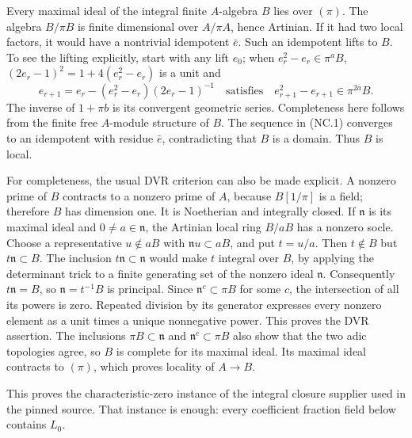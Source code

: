 Every maximal ideal of the integral finite \(A\)-algebra \(B\)
lies over \((\pi)\). The algebra \(B/\pi B\) is finite dimensional
over \(A/\pi A\), hence Artinian. If it had two local factors,
it would have a nontrivial idempotent \(\bar e\).
Such an idempotent lifts to \(B\). To see the lifting explicitly,
start with any lift \(e_0\); when \(e_r^2-e_r\in\pi^a B\),
\((2e_r-1)^2=1+4(e_r^2-e_r)\) is a unit and
\[
 e_{r+1}=e_r-(e_r^2-e_r)(2e_r-1)^{-1}
 \quad\text{satisfies}\quad
 e_{r+1}^2-e_{r+1}\in\pi^{2a}B.
 \tag{NC.1}
\]
The inverse of \(1+\pi b\) is its convergent geometric series.
Completeness here follows from the finite free \(A\)-module
structure of \(B\). The sequence in (NC.1) converges to an
idempotent with residue \(\bar e\), contradicting that \(B\)
is a domain. Thus \(B\) is local.

For completeness, the usual DVR criterion can also be made
explicit. A nonzero prime of \(B\) contracts to a nonzero prime
of \(A\), because \(B[1/\pi]\) is a field; therefore \(B\) has
dimension one. It is Noetherian and integrally closed.
If \(\mathfrak n\) is its maximal ideal and \(0\ne a\in\mathfrak n\),
the Artinian local ring \(B/aB\) has a nonzero socle. Choose a
representative \(u\notin aB\) with
\(\mathfrak n u\subset aB\), and put \(t=u/a\).
Then \(t\notin B\) but \(t\mathfrak n\subset B\).
The inclusion \(t\mathfrak n\subset\mathfrak n\) would make \(t\)
integral over \(B\), by applying the determinant trick to a finite
generating set of the nonzero ideal \(\mathfrak n\).
Consequently \(t\mathfrak n=B\), so \(\mathfrak n=t^{-1}B\)
is principal. Since \(\mathfrak n^c\subset\pi B\) for some \(c\),
the intersection of all its powers is zero. Repeated division
by its generator expresses every nonzero element as a unit times
a unique nonnegative power. This proves the DVR assertion.
The inclusions
\(\pi B\subset\mathfrak n\) and \(\mathfrak n^c\subset\pi B\)
also show that the two adic topologies agree, so \(B\) is complete
for its maximal ideal. Its maximal ideal contracts to \((\pi)\),
which proves locality of \(A\longrightarrow B\).

This proves the characteristic-zero instance of the integral
closure supplier used in the pinned source. That instance is
enough: every coefficient fraction field below contains \(L_0\).

